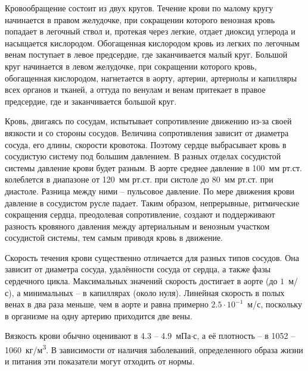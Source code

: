 Кровообращение состоит из двух кругов. Течение крови по малому кругу начинается в правом желудочке, при сокращении которого венозная кровь попадает в легочный ствол и, 
протекая через легкие, отдает диоксид углерода и насыщается кислородом. Обогащенная кислородом кровь из легких по легочным венам 
поступает в левое предсердие, где заканчивается малый круг. Большой круг начинается в левом желудочке, при сокращении которого кровь, 
обогащенная кислородом, нагнетается в аорту, артерии, артериолы и капилляры всех органов и тканей, а оттуда по венулам и венам 
притекает в правое предсердие, где и заканчивается большой круг.

Кровь, двигаясь по сосудам, испытывает сопротивление движению из-за своей вязкости и со стороны сосудов. 
Величина сопротивления зависит от диаметра сосуда, его длины, скорости кровотока. Поэтому сердце выбрасывает кровь 
в сосудистую систему под большим давлением. В разных отделах сосудистой системы давление крови будет разным. 
В аорте среднее давление в 100~мм рт.ст. колеблется в диапазоне от 120~мм рт.ст. при систоле до 80~мм рт.ст. при диастоле. 
Разница между ними -- пульсовое давление. По мере движения крови давление в сосудистом русле падает. Таким образом, непрерывные, 
ритмические сокращения сердца, преодолевая сопротивление, создают и поддерживают разность кровяного давления между артериальным и 
венозным участком сосудистой системы, тем самым приводя кровь в движение.

Скорость течения крови существенно отличается для разных типов сосудов. Она зависит от диаметра сосуда, удалённости сосуда от сердца,
а также фазы сердечного цикла. Максимальных значений скорость достигает в аорте (до \texttilde$1$~м/с), а минимальных --
в капиллярах (около нуля).
Линейная скорость в полых венах в два раза меньше, 
чем в аорте и равна примерно $2.5\cdot10^{-1}$~м/с, поскольку в организме на одну артерию приходится две вены. 

Вязкость крови обычно оценивают в 4.3 -- 4.9~мПа$\cdot$с, а её плотность -- в 1052 -- 1060~кг/м\textsuperscript{3}. 
В зависимости от наличия заболеваний, определенного образа жизни и питания эти показатели могут отходить от нормы. 


